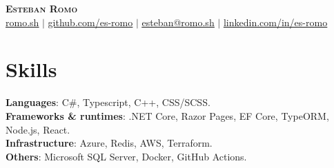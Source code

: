 \documentclass[letterpaper,11pt]{article}
\begin{document}
\begin{center}
    \textbf{\Huge \scshape Esteban Romo} \\ \vspace{1pt}
    \href{https://romo.sh}{\underline{romo.sh}} $|$ 
    \href{https://github.com/es-romo}{\underline{github.com/es-romo}} $|$ 
    \href{mailto:esteban@romo.sh}{\underline{esteban@romo.sh}} $|$ 
    \href{https://www.linkedin.com/in/es-romo/}{\underline{linkedin.com/in/es-romo}}
\end{center}


\begin{minipage}[t]{.78\textwidth}
  \section{Skills}
  \begin{itemize}[leftmargin=0.15in, label={}]
      \small{\item{
      \textbf{Languages}{: C\#, Typescript, C++, CSS/SCSS.} \\
      \textbf{Frameworks \& runtimes}{: .NET Core, Razor Pages, EF Core, TypeORM, Node.js, React.} \\
      \textbf{Infrastructure}{: Azure, Redis, AWS, Terraform.} \\
      \textbf{Others}{: Microsoft SQL Server, Docker, GitHub Actions.} \\
      }}
  \end{itemize}
\end{minipage}\hspace{.02\textwidth}%
\end{document}
